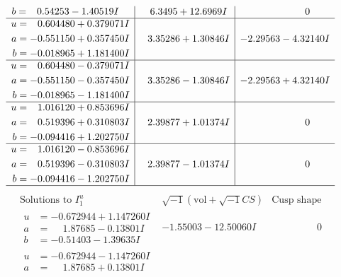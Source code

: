 \documentclass[1p]{elsarticle_modified}
\theoremstyle{definition}
\newcommand{\I}{\sqrt{-1}}
\begin{document}
$$\begin{array}{c|c|c}
\begin{aligned}
b &= \phantom{-}0.54253 - 1.40519 I\end{aligned}
 & \phantom{-}6.3495 + 12.6969 I & \phantom{-0.000000 } 0 \\ \hline\begin{aligned}
u &= \phantom{-}0.604480 + 0.379071 I \\
a &= -0.551150 + 0.357450 I \\
b &= -0.018965 + 1.181400 I\end{aligned}
 & \phantom{-}3.35286 + 1.30846 I & -2.29563 - 4.32140 I \\ \hline\begin{aligned}
u &= \phantom{-}0.604480 - 0.379071 I \\
a &= -0.551150 - 0.357450 I \\
b &= -0.018965 - 1.181400 I\end{aligned}
 & \phantom{-}3.35286 - 1.30846 I & -2.29563 + 4.32140 I \\ \hline\begin{aligned}
u &= \phantom{-}1.016120 + 0.853696 I \\
a &= \phantom{-}0.519396 + 0.310803 I \\
b &= -0.094416 + 1.202750 I\end{aligned}
 & \phantom{-}2.39877 + 1.01374 I & \phantom{-0.000000 } 0 \\ \hline\begin{aligned}
u &= \phantom{-}1.016120 - 0.853696 I \\
a &= \phantom{-}0.519396 - 0.310803 I \\
b &= -0.094416 - 1.202750 I\end{aligned}
 & \phantom{-}2.39877 - 1.01374 I & \phantom{-0.000000 } 0\\
 \hline 
 \end{array}$$\newpage$$\begin{array}{c|c|c}  
\text{Solutions to }I^u_{1}& \I (\text{vol} + \sqrt{-1}CS) & \text{Cusp shape}\\
 \hline 
\begin{aligned}
u &= -0.672944 + 1.147260 I \\
a &= \phantom{-}1.87685 - 0.13801 I \\
b &= -0.51403 - 1.39635 I\end{aligned}
 & -1.55003 - 12.50060 I & \phantom{-0.000000 } 0 \\ \hline\begin{aligned}
u &= -0.672944 - 1.147260 I \\
a &= \phantom{-}1.87685 + 0.13801 I \\

\end{aligned}
\end{array}$$
\end{document}
